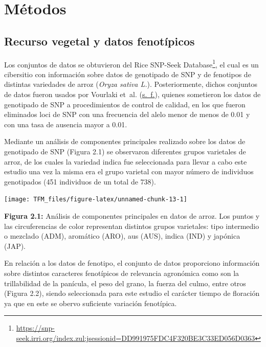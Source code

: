 \documentclass[11pt,spanish,a4paper,oneside,]{book} %
\renewcommand{\href}[2]{#2\footnote{\url{#1}}}
\let\rmarkdownfootnote\footnote%
\def\footnote{\protect\rmarkdownfootnote}
\begin{document}
\hypertarget{methods2}{%
\section{Métodos}\label{methods2}}

\hypertarget{recurso-vegetal-y-datos-fenotuxedpicos}{%
\subsection{Recurso vegetal y datos fenotípicos}\label{recurso-vegetal-y-datos-fenotuxedpicos}}

Los conjuntos de datos se obtuvieron del \href{https://snp-seek.irri.org/index.zul;jsessionid=DD991975FDC4F320BE3C33ED056D0363}{Rice SNP-Seek Database}, el cual es un cibersitio con información sobre datos de genotipado de SNP y de fenotipos de distintas variedades de arroz (\emph{Oryza sativa L.}). Posteriormente, dichos conjuntos de datos fueron usados por Vourlaki et~al. (\protect\hyperlink{ref-cite:26}{s.~f.}), quienes sometieron los datos de genotipado de SNP a procedimientos de control de calidad, en los que fueron eliminados loci de SNP con una frecuencia del alelo menor de menos de 0.01 y con una tasa de ausencia mayor a 0.01.

Mediante un análisis de componentes principales realizado sobre los datos de genotipado de SNP (Figura 2.1) se observaron diferentes grupos varietales de arroz, de los cuales la variedad indica fue seleccionada para llevar a cabo este estudio una vez la misma era el grupo varietal con mayor número de individuos genotipados (451 individuos de un total de 738).

\begin{center}\texttt{[image: TFM\_files/figure-latex/unnamed-chunk-13-1]} \end{center}

\begin{center}
\textbf{Figura 2.1:} Análisis de componentes principales en datos de arroz. Los puntos y las circuferencias de color representan distintos grupos varietales: tipo intermedio o mezclado (ADM), aromático (ARO), aus (AUS), indica (IND) y japónica (JAP).

\end{center}

En relación a los datos de fenotipo, el conjunto de datos proporciono información sobre distintos caracteres fenotípicos de relevancia agronómica como son la trillabilidad de la panícula, el peso del grano, la fuerza del culmo, entre otros (Figura 2.2), siendo seleccionada para este estudio el carácter tiempo de floración ya que en este se obervo suficiente variación fenotípica.
\end{document}
